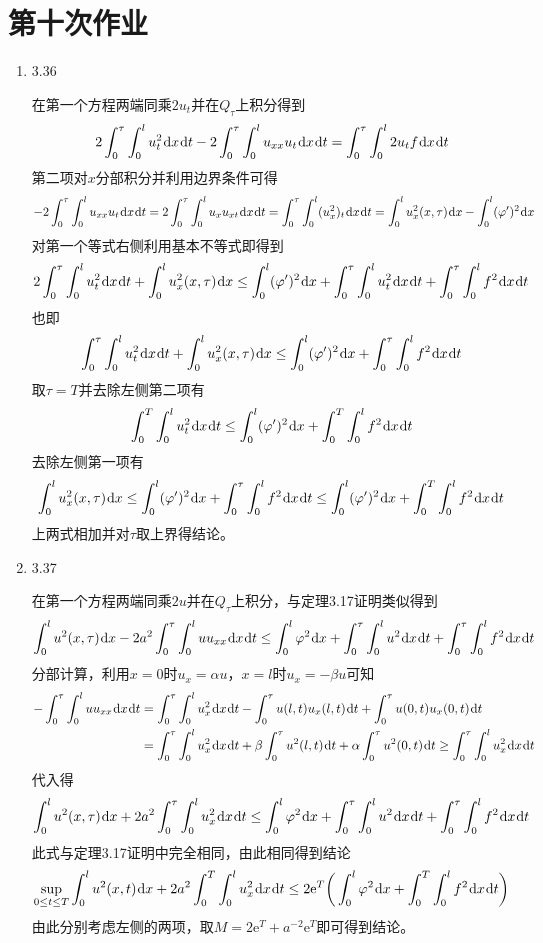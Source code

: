\documentclass[a4paper,UTF8,fontset=windows,10pt]{ctexart}
\newcommand*{\dr}{\hspace{0.07em}\mathrm{d}}
\newcommand*{\er}{\mathrm{e}}
\begin{document}
\section{第十次作业}
\begin{enumerate}
    \item 3.36
    
    在第一个方程两端同乘$2u_t$并在$Q_\tau$上积分得到
    $$2\int_0^\tau\int_0^lu_t^2\dr x\dr t-2\int_0^\tau\int_0^lu_{xx}u_t\dr x\dr t=\int_0^\tau\int_0^l2u_tf\dr x\dr t$$
    第二项对$x$分部积分并利用边界条件可得
    $$-2\int_0^\tau\int_0^lu_{xx}u_t\dr x\dr t=2\int_0^\tau\int_0^lu_xu_{xt}\dr x\dr t=\int_0^\tau\int_0^l(u_x^2)_t\dr x\dr t=\int_0^lu_x^2(x,\tau)\dr x-\int_0^l(\varphi')^2\dr x$$
    对第一个等式右侧利用基本不等式即得到
    $$2\int_0^\tau\int_0^lu_t^2\dr x\dr t+\int_0^lu_x^2(x,\tau)\dr x\le\int_0^l(\varphi')^2\dr x+\int_0^\tau\int_0^lu_t^2\dr x\dr t+\int_0^\tau\int_0^lf^2\dr x\dr t$$
    也即
    $$\int_0^\tau\int_0^lu_t^2\dr x\dr t+\int_0^lu_x^2(x,\tau)\dr x\le\int_0^l(\varphi')^2\dr x+\int_0^\tau\int_0^lf^2\dr x\dr t$$
    取$\tau=T$并去除左侧第二项有
    $$\int_0^T\int_0^lu_t^2\dr x\dr t\le\int_0^l(\varphi')^2\dr x+\int_0^T\int_0^lf^2\dr x\dr t$$
    去除左侧第一项有
    $$\int_0^lu_x^2(x,\tau)\dr x\le\int_0^l(\varphi')^2\dr x+\int_0^\tau\int_0^lf^2\dr x\dr t\le\int_0^l(\varphi')^2\dr x+\int_0^T\int_0^lf^2\dr x\dr t$$
    上两式相加并对$\tau$取上界得结论。
    
    \item 3.37
    
    在第一个方程两端同乘$2u$并在$Q_\tau$上积分，与定理3.17证明类似得到
    $$\int_0^lu^2(x,\tau)\dr x-2a^2\int_0^\tau\int_0^luu_{xx}\dr x\dr t\le\int_0^l\varphi^2\dr x+\int_0^\tau\int_0^lu^2\dr x\dr t+\int_0^\tau\int_0^lf^2\dr x\dr t$$
    分部计算，利用$x=0$时$u_x=\alpha u$，$x=l$时$u_x=-\beta u$可知
    $$\begin{aligned}-\int_0^\tau\int_0^luu_{xx}\dr x\dr t&=\int_0^\tau\int_0^lu_x^2\dr x\dr t-\int_0^\tau u(l,t)u_x(l,t)\dr t+\int_0^\tau u(0,t)u_x(0,t)\dr t\\ &=\int_0^\tau\int_0^lu_x^2\dr x\dr t+\beta\int_0^\tau u^2(l,t)\dr t+\alpha\int_0^\tau u^2(0,t)\dr t\ge\int_0^\tau\int_0^lu_x^2\dr x\dr t\end{aligned}$$
    代入得
    $$\int_0^lu^2(x,\tau)\dr x+2a^2\int_0^\tau\int_0^lu_x^2\dr x\dr t\le\int_0^l\varphi^2\dr x+\int_0^\tau\int_0^lu^2\dr x\dr t+\int_0^\tau\int_0^lf^2\dr x\dr t$$
    此式与定理3.17证明中完全相同，由此相同得到结论
    $$\sup_{0\le t\le T}\int_0^lu^2(x,t)\dr x+2a^2\int_0^T\int_0^lu_x^2\dr x\dr t\le 2\er^T\bigg(\int_0^l\varphi^2\dr x+\int_0^T\int_0^lf^2\dr x\dr t\bigg)$$
    由此分别考虑左侧的两项，取$M=2\er^T+a^{-2}\er^T$即可得到结论。
    

\end{enumerate}
\end{document}
